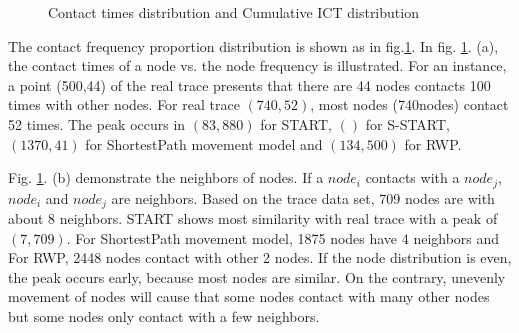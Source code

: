 \begin{figure}
\centering
{}

\caption{Contact times distribution and Cumulative ICT distribution}\label{figure_contacts}
\end{figure}

The contact frequency proportion distribution is shown as in fig.\ref{figure_contacts}. In fig. \ref{figure_contacts}. (a), the contact times of a node vs. the node frequency is illustrated. For an instance, a point (500,44) of the real trace presents that there are 44 nodes contacts 100 times with other nodes. For real trace $(740,52)$, most nodes (740nodes) contact 52 times.  The peak occurs in $(83, 880)$ for START, $()$ for S-START, $(1370,41)$ for ShortestPath movement model and $(134, 500)$ for RWP.

Fig. \ref{figure_contacts}. (b) demonstrate the neighbors of nodes. If a $node_i$ contacts with a $node_j$, $node_i$ and $node_j$ are neighbors. Based on the trace data set, 709 nodes are with about 8 neighbors. START shows most similarity with real trace with a peak of  $(7,709)$.  For ShortestPath movement model, 1875 nodes have 4 neighbors and For RWP, 2448 nodes contact with other 2 nodes. If the node distribution is even, the peak occurs early, because most nodes are similar. On the contrary, unevenly movement of nodes will cause that some nodes contact with many other nodes but some nodes only contact with a few neighbors.

